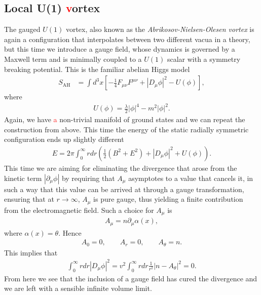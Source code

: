         \subsection{Local U(1) \textcolor{red}{v}ortex}
        The gauged $U(1)$ vortex, also known as the \textit{Abrikosov-Nielsen-Olesen vortex} is again a configuration that interpolates between two different vacua in a theory, but this time we introduce a gauge field, whose dynamics is governed by a Maxwell term and is minimally coupled to a $U(1)$ scalar with a symmetry breaking potential. This is the familiar abelian Higgs model
        \begin{align}
            S_{\text{AH}} & = \int d^3x \left[-\frac{1}{4} F_{\mu \nu} F^{\mu \nu} + | D_{\mu} \phi|^2 - U(\phi) \right], \label{eq:Abelian_Higgs_Model}
        \end{align}
        where
        \begin{align}
            U(\phi) = \frac{\lambda}{2} |\phi|^4 - m^2 |\phi|^2.
        \end{align}
    Again, we have \textcolor{red}{a} non-trivial manifold of ground states and we can repeat the construction from above. This time the energy of the static radially symmetric configuration ends up slightly different
    \begin{align}
        E = 2 \pi \int_0^{\infty} r dr \left(\frac{1}{2}( B^2 + E^2) + |D_{\mu} \phi|^2 + U(\phi) \right) .
    \end{align}
    This time we are aiming for eliminating the divergence that arose from the kinetic term $|\partial_{\mu}\phi|$ by requiring that $A_{\mu}$ asymptotes to a value that cancels it, in such a way that this value can be arrived at through a gauge transformation, ensuring that at $r\rightarrow \infty$, $A_{\mu}$ is pure gauge, thus yielding a finite contribution from the electromagnetic field. Such a choice for $A_{\mu}$ is
    \begin{align}
        A_{\mu} = n \partial_{\mu} \alpha(x),
    \end{align}
    where $\alpha(x) = \theta$. Hence
    \begin{align}
        A_0 =0, \qquad A_r =0, \qquad A_{\theta} = n.
    \end{align}
    This implies that
    \begin{align}
        \int_0^{\infty} r dr |D_{\mu}\phi|^2 = v^2\int_0^{\infty} r dr  \frac{1}{r^2}|n-A_{\theta}|^2 =0.
    \end{align}
    From here we see that the inclusion of a gauge field has cured the divergence and we are left with a sensible infinite volume limit. \\
